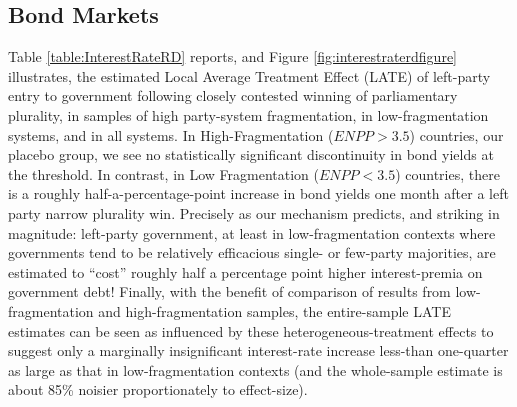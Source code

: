 \documentclass[12pt]{article}
\begin{document}
\subsection{Bond Markets}

Table \ref{table:InterestRateRD} reports, and Figure  \ref{fig:interestraterdfigure} illustrates, the estimated Local Average Treatment Effect (LATE) of left-party entry to government following closely contested winning of parliamentary plurality, in samples of high party-system fragmentation, in low-fragmentation systems, and in all systems. In High-Fragmentation ($ENPP > 3.5$) countries, our placebo group, we see no statistically significant discontinuity in bond yields at the threshold. In contrast, in Low Fragmentation ($ENPP < 3.5$) countries, there is a roughly half-a-percentage-point increase in bond yields one month after a left party narrow plurality win. Precisely as our mechanism predicts, and striking in magnitude: left-party government, at least in low-fragmentation contexts where governments tend to be relatively efficacious single- or few-party majorities, are estimated to ``cost'' roughly half a percentage point higher interest-premia on government debt! Finally, with the benefit of comparison of results from low-fragmentation and high-fragmentation samples, the entire-sample LATE estimates can be seen as influenced by these heterogeneous-treatment effects to suggest only a marginally insignificant interest-rate increase less-than one-quarter as large as that in low-fragmentation contexts (and the whole-sample estimate is about 85\% noisier proportionately to effect-size).
\end{document}
